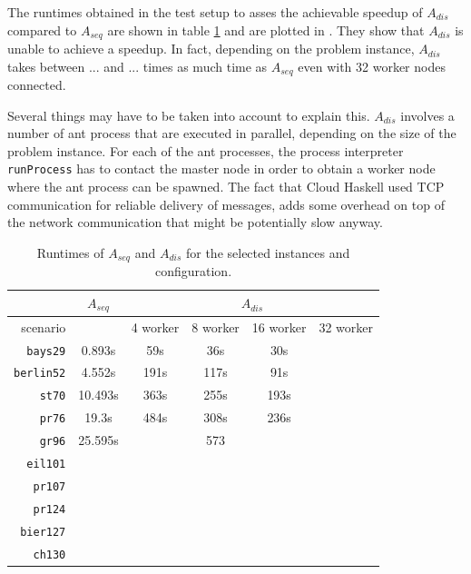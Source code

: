 The runtimes obtained in the test setup to asses the achievable speedup of $A_{dis}$ compared to $A_{seq}$ are shown in table \ref{tbl:test2} and are plotted in . They show that $A_{dis}$ is unable to achieve a speedup. In fact, depending on the problem instance, $A_{dis}$ takes between ... and ... times as much time as $A_{seq}$ even with 32 worker nodes connected.

Several things may have to be taken into account to explain this. $A_{dis}$ involves a number of ant process that are executed in parallel, depending on the size of the problem instance. For each of the ant processes, the process interpreter \texttt{runProcess} has to contact the master node in order to obtain a worker node where the ant process can be spawned. The fact that \textsf{Cloud Haskell} used TCP communication for reliable delivery of messages, adds some overhead on top of the network communication that might be potentially slow anyway.

\begin{table}[h!]
  \centering
  \begin{tabular}{r|c||c|c|c|c|}
    \cline{2-6}
    & \multicolumn{1}{c||}{$A_{seq}$} & \multicolumn{4}{c|}{$A_{dis}$} \\
    \hline
    \multicolumn{1}{|r||}{scenario} & & 4 worker & 8 worker & 16 worker & 32 worker \\
    \hline
    \hline
    \multicolumn{1}{|r||}{\texttt{bays29}} & 0.893s & 59s & 36s & 30s & \\
    \hline
    \multicolumn{1}{|r||}{\texttt{berlin52}} & 4.552s & 191s & 117s & 91s & \\
    \hline
    \multicolumn{1}{|r||}{\texttt{st70}} & 10.493s & 363s & 255s & 193s & \\
    \hline
    \multicolumn{1}{|r||}{\texttt{pr76}} & 19.3s & 484s & 308s & 236s & \\
    \hline
    \multicolumn{1}{|r||}{\texttt{gr96}} & 25.595s & & 573 & & \\
    \hline
    \multicolumn{1}{|r||}{\texttt{eil101}} & & & & & \\
    \hline
    \multicolumn{1}{|r||}{\texttt{pr107}} & & & & & \\
    \hline
    \multicolumn{1}{|r||}{\texttt{pr124}} & & & & & \\
    \hline
    \multicolumn{1}{|r||}{\texttt{bier127}} & & & & & \\
    \hline
    \multicolumn{1}{|r||}{\texttt{ch130}} & & & & & \\
    \hline
  \end{tabular}
  \caption{Runtimes of $A_{seq}$ and $A_{dis}$ for the selected instances and configuration.}
  \label{tbl:test2}
\end{table}


